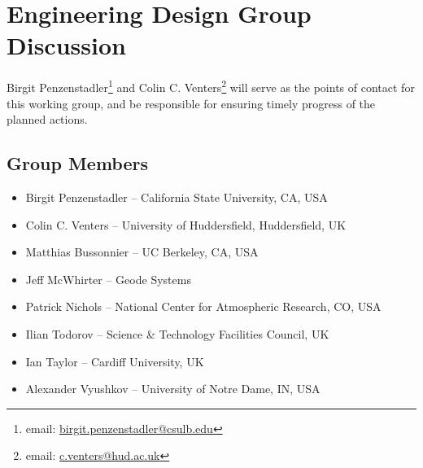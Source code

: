 \section{Engineering Design Group Discussion}
\label{sec:appendix_eng_design}

Birgit Penzenstadler\footnote{email: \href{mailto:birgit.penzenstadler@csulb.edu}{birgit.penzenstadler@csulb.edu}} and Colin C. Venters\footnote{email: \href{mailto:c.venters@hud.ac.uk}{c.venters@hud.ac.uk}} will serve as the points of contact for this working group, and be responsible for ensuring timely progress of the planned actions.

\subsection{Group Members}

\begin{itemize}
\item Birgit Penzenstadler -- California State University, CA, USA
\item Colin C. Venters -- University of Huddersfield, Huddersfield, UK
\item Matthias Bussonnier -- UC Berkeley, CA, USA
\item Jeff McWhirter -- Geode Systems 
\item Patrick Nichols -- National Center for Atmospheric Research, CO, USA
\item Ilian Todorov -- Science \& Technology Facilities Council, UK
\item Ian Taylor -- Cardiff University, UK
\item Alexander Vyushkov -- University of Notre Dame, IN, USA
\end{itemize}


